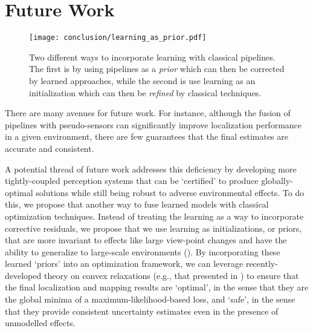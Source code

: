 

\section{Future Work}

\begin{figure}
\begin{center}
		\texttt{[image: conclusion/learning\_as\_prior.pdf]}
		\caption{Two different ways to incorporate learning with classical pipelines. The first is by using pipelines as a \textit{prior} which can then be corrected by learned approaches, while the second is use learning as an initialization which can then be \textit{refined} by classical techniques.}
  	\label{fig:conc_learning_as_prior}
\end{center}
\end{figure}


There are many avenues for future work. For instance, although the fusion of pipelines with pseudo-sensors can significantly improve localization performance in a given environment, there are few guarantees that the final estimates are accurate and consistent.

A potential thread of future work addresses this deficiency by developing more tightly-coupled perception systems that can be ‘certified’ to produce globally-optimal solutions while still being robust to adverse environmental effects. To do this, we propose that another way to fuse learned models with classical optimization techniques. Instead of treating the learning as a way to incorporate corrective residuals, we propose that we use learning as initializations, or priors, that are more invariant to effects like large view-point changes and have the ability to generalize to large-scale environments (). By incorporating these learned ‘priors’ into an optimization framework, we can leverage recently-developed theory on convex relaxations (e.g., that presented in \cite{Rosen2019-kk}) to ensure that the final localization and mapping results are ‘optimal’, in the sense that they are the global minima of a maximum-likelihood-based loss, and ‘safe’, in the sense that they provide consistent uncertainty estimates even in the presence of unmodelled effects. 

